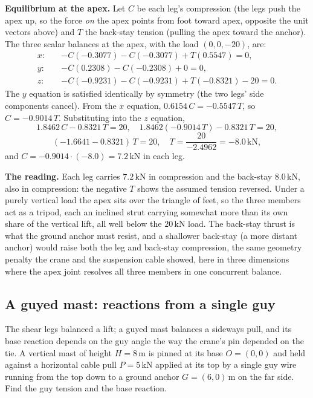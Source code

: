 \textbf{Equilibrium at the apex.} Let $C$ be each leg's compression
(the legs push the apex up, so the force \emph{on} the apex points from foot
toward apex, opposite the unit vectors above) and $T$ the back-stay tension
(pulling the apex toward the anchor). The three scalar balances at the apex,
with the load $(0,0,{-20})$, are:
\begin{align*}
x:&\quad {-C}({-0.3077}) - C({-0.3077}) + T(0.5547) = 0,\\
y:&\quad {-C}(0.2308) - C({-0.2308}) + 0 = 0,\\
z:&\quad {-C}({-0.9231}) - C({-0.9231}) + T({-0.8321}) - 20 = 0.
\end{align*}
The $y$ equation is satisfied identically by symmetry (the two legs' side
components cancel). From the $x$ equation, $0.6154\,C = -0.5547\,T$, so
$C = -0.9014\,T$. Substituting into the $z$ equation,
\[
1.8462\,C - 0.8321\,T = 20, \quad
1.8462(-0.9014\,T) - 0.8321\,T = 20,
\]
\[
(-1.6641 - 0.8321)\,T = 20, \quad T = \frac{20}{-2.4962} = -8.0\,\text{kN},
\]
and $C = -0.9014\cdot(-8.0) = 7.2\,\text{kN}$ in each leg.

\textbf{The reading.} Each leg carries $7.2\,\text{kN}$ in compression and
the back-stay $8.0\,\text{kN}$, also in compression: the negative $T$ shows the
assumed tension reversed. Under a purely vertical load the apex sits over the
triangle of feet, so the three members act as a tripod, each an inclined strut
carrying somewhat more than its own share of the vertical lift, all well below
the $20\,\text{kN}$ load. The back-stay thrust is what the ground anchor must
resist, and a shallower back-stay (a more distant anchor) would raise both the
leg and back-stay compression, the same geometry penalty the crane and the
suspension cable showed, here in three dimensions where the apex joint resolves
all three members in one concurrent balance.

\subsection{A guyed mast: reactions from a single guy}

The shear legs balanced a lift; a guyed mast balances a sideways pull, and
its base reaction depends on the guy angle the way the crane's pin depended
on the tie. A vertical mast of height $H = 8\,\si{\meter}$ is pinned at its
base $O = (0,0)$ and held against a horizontal cable pull
$P = 5\,\text{kN}$ applied at its top by a single guy wire running from the
top down to a ground anchor $G = (6, 0)\,\si{\meter}$ on the far side. Find
the guy tension and the base reaction.

